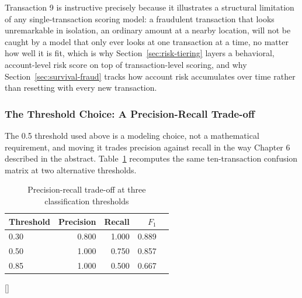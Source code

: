 \documentclass[../ai_in_finance]{subfiles}
\begin{document}
Transaction 9 is instructive precisely because it illustrates a structural limitation of any single-transaction scoring model: a fraudulent transaction that looks unremarkable in isolation, an ordinary amount at a nearby location, will not be caught by a model that only ever looks at one transaction at a time, no matter how well it is fit, which is why Section~\ref{sec:risk-tiering} layers a behavioral, account-level risk score on top of transaction-level scoring, and why Section~\ref{sec:survival-fraud} tracks how account risk accumulates over time rather than resetting with every new transaction.

\subsubsection*{The Threshold Choice: A Precision-Recall Trade-off}

The 0.5 threshold used above is a modeling choice, not a mathematical requirement, and moving it trades precision against recall in the way Chapter 6 described in the abstract. Table~\ref{tab:threshold_tradeoff} recomputes the same ten-transaction confusion matrix at two alternative thresholds.

\begin{table}[htbp]
\centering
\begin{lrbox}{\bookmeasuredbox}
\begin{tabular}{lrrrr}
\toprule
Threshold & Precision & Recall & $F_1$ \\
\midrule
0.30 & 0.800 & 1.000 & 0.889 \\
0.50 & 1.000 & 0.750 & 0.857 \\
0.85 & 1.000 & 0.500 & 0.667 \\
\bottomrule
\end{tabular}
\end{lrbox}
\ifdim\wd\bookmeasuredbox<0.65\linewidth
\setlength{\bookcapwidth}{0.65\linewidth}
\else
\setlength{\bookcapwidth}{\wd\bookmeasuredbox}
\fi
{}[\bookcapwidth]{
\usebox{\bookmeasuredbox}
}{
\caption{Precision-recall trade-off at three classification thresholds}
\label{tab:threshold_tradeoff}
}
\end{table}
\end{document}
